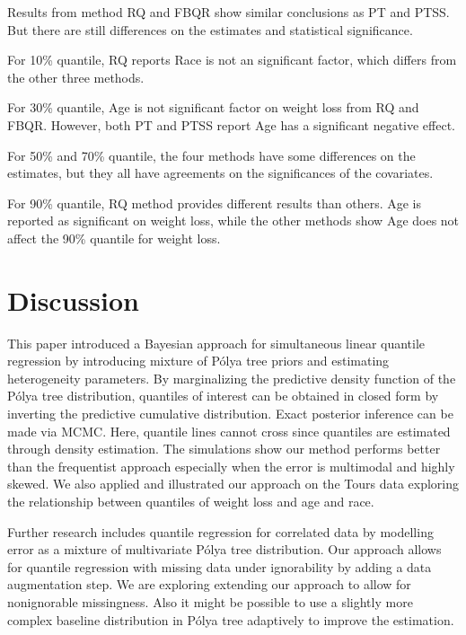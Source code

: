 \documentclass[12pt]{article}
\newcommand{\polya}{P\'{o}lya}
\begin{document}
Results from method RQ and FBQR show similar conclusions as PT and
PTSS.  But there are still differences on the estimates and
statistical significance.

For 10\% quantile, RQ reports Race is not an significant factor, which
differs from the other three methods.

For 30\% quantile, Age is not significant factor on weight loss from
RQ and FBQR. However, both PT and PTSS report Age has a significant
negative effect.

For 50\% and 70\% quantile, the four methods have some differences on
the estimates, but they all have agreements on the significances of
the covariates.

For 90\% quantile, RQ method provides different results than
others. Age is reported as significant on weight loss, while the other
methods show Age does not affect the 90\% quantile for weight loss.

\section{Discussion}
\label{ch2:sec:discussion}
This paper introduced a Bayesian approach for simultaneous linear
quantile regression by introducing mixture of \polya{} tree priors and
estimating heterogeneity parameters. By marginalizing the predictive
density function of the \polya{} tree distribution, quantiles of
interest can be obtained in closed form by inverting the predictive
cumulative distribution. Exact posterior inference can be made via
MCMC. Here, quantile lines cannot cross since quantiles are estimated
through density estimation. The simulations show our method performs
better than the frequentist approach especially when the error is
multimodal and highly skewed.  We also applied and illustrated our
approach on the Tours data exploring the relationship between
quantiles of weight loss and age and race.

Further research includes quantile regression for correlated data by
modelling error as a mixture of multivariate \polya{} tree
distribution.  Our approach allows for quantile regression with
missing data under ignorability by adding a data augmentation step.
We are exploring extending our approach to allow for nonignorable
missingness. Also it might be possible to use a slightly more complex
baseline distribution in \polya{} tree adaptively to improve the
estimation.


 
\end{document}
